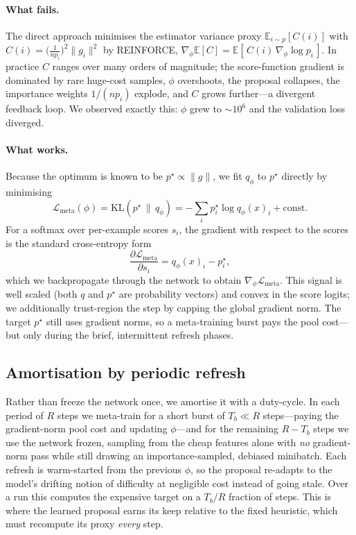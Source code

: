 \documentclass[11pt]{article}
\begin{document}
\paragraph{What fails.} The direct approach minimises the estimator variance
proxy $\mathbb{E}_{i\sim p}[C(i)]$ with
$C(i)=\big(\tfrac{1}{n p_i}\big)^2\|g_i\|^2$ by REINFORCE,
$\nabla_\phi \mathbb{E}[C] = \mathbb{E}[\,C(i)\,\nabla_\phi \log p_i\,]$. In
practice $C$ ranges over many orders of magnitude; the score-function gradient is
dominated by rare huge-cost samples, $\phi$ overshoots, the proposal collapses,
the importance weights $1/(n p_i)$ explode, and $C$ grows further---a divergent
feedback loop. We observed exactly this: $\phi$ grew to $\sim\!10^6$ and the
validation loss diverged.

\paragraph{What works.} Because the optimum is known to be $p^\star\propto\|g\|$,
we fit $q_\phi$ to $p^\star$ directly by minimising
\begin{equation}
\mathcal L_{\text{meta}}(\phi) = \mathrm{KL}\!\left(p^\star \,\big\|\, q_\phi\right)
= -\sum_i p^\star_i \log q_\phi(x)_i + \text{const}.
\end{equation}
For a softmax over per-example scores $s_i$, the gradient with respect to the
scores is the standard cross-entropy form
\begin{equation}
\frac{\partial \mathcal L_{\text{meta}}}{\partial s_i}
= q_\phi(x)_i - p^\star_i ,
\label{eq:metagrad}
\end{equation}
which we backpropagate through the network to obtain $\nabla_\phi\mathcal
L_{\text{meta}}$. This signal is well scaled (both $q$ and $p^\star$ are
probability vectors) and convex in the score logits; we additionally
trust-region the step by capping the global gradient norm. The
target $p^\star$ still uses gradient norms, so a meta-training burst pays the pool
cost---but only during the brief, intermittent refresh phases.

\subsection{Amortisation by periodic refresh}
Rather than freeze the network once, we amortise it with a duty-cycle. In each
period of $R$ steps we meta-train for a short burst of $T_b\ll R$ steps---paying
the gradient-norm pool cost and updating $\phi$---and for the remaining $R-T_b$
steps we use the network frozen, sampling from the cheap features alone with
\emph{no} gradient-norm pass while still drawing an importance-sampled, debiased
minibatch. Each refresh is warm-started from the previous $\phi$, so the proposal
re-adapts to the model's drifting notion of difficulty at negligible cost instead
of going stale. Over a run this computes the expensive target on a $T_b/R$
fraction of steps. This is where the learned proposal earns its keep relative to
the fixed heuristic, which must recompute its proxy \emph{every} step.
\end{document}
